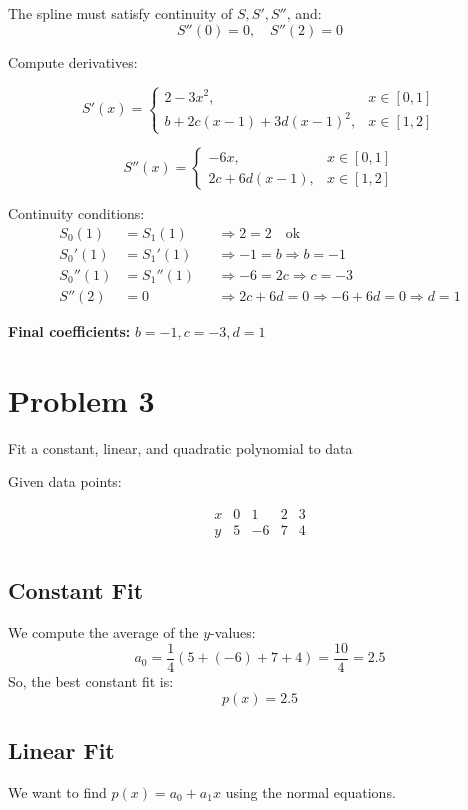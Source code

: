 \documentclass{article}
\begin{document}
The spline must satisfy continuity of \( S, S', S'' \), and:
\[
S''(0) = 0, \quad S''(2) = 0
\]

Compute derivatives:

\[
S'(x) =
\begin{cases}
2 - 3x^2, & x \in [0,1] \\
b + 2c(x-1) + 3d(x-1)^2, & x \in [1,2]
\end{cases}
\]

\[
S''(x) =
\begin{cases}
-6x, & x \in [0,1] \\
2c + 6d(x-1), & x \in [1,2]
\end{cases}
\]

Continuity conditions:
\begin{align*}
S_0(1) &= S_1(1) &&\Rightarrow 2 = 2 \quad \text{ok} \\
S_0'(1) &= S_1'(1) &&\Rightarrow -1 = b \Rightarrow b = -1 \\
S_0''(1) &= S_1''(1) &&\Rightarrow -6 = 2c \Rightarrow c = -3 \\
S''(2) &= 0 &&\Rightarrow 2c + 6d = 0 \Rightarrow -6 + 6d = 0 \Rightarrow d = 1
\end{align*}

\textbf{Final coefficients:} \( b = -1, c = -3, d = 1 \)

\section*{Problem 3}
Fit a constant, linear, and quadratic polynomial to data

Given data points:

\[
\begin{array}{c|cccc}
x & 0 & 1 & 2 & 3 \\
\hline
y & 5 & -6 & 7 & 4 \\
\end{array}
\]


\subsection*{Constant Fit}

We compute the average of the \( y \)-values:
\[
a_0 = \frac{1}{4}(5 + (-6) + 7 + 4) = \frac{10}{4} = 2.5
\]
So, the best constant fit is:
\[
p(x) = 2.5
\]
%
\subsection*{Linear Fit}
%
We want to find \( p(x) = a_0 + a_1 x \) using the normal equations.
\end{document}
